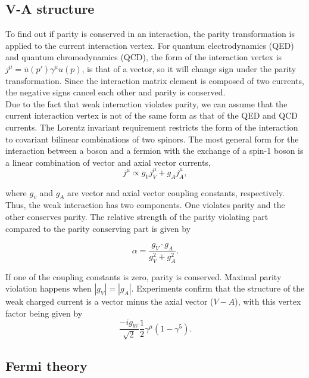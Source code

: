 \documentclass[10pt,swedish, openany]{book}
\begin{document}
\subsection{V-A structure}

To find out if parity is conserved in an interaction, the parity transformation is applied to the current interaction vertex. For quantum electrodynamics (QED) and quantum chromodynamics (QCD), the form of the interaction vertex is $j^{\mu}=\bar{u}(p')\gamma^{\mu}u(p)$, is that of a vector, so it will change sign under the parity transformation. Since the interaction matrix element is composed of two currents, the negative signs cancel each other and parity is conserved.\\

Due to the fact that weak interaction violates parity, we can assume that the current interaction vertex is not of the same form as that of the QED and QCD currents. The Lorentz invariant requirement restricts the form of the interaction to covariant bilinear combinations of two spinors. The most general form for the interaction between a boson and a fermion with the exchange of a spin-1 boson is a linear combination of vector and axial vector currents, 
\begin{equation}
    j^{\mu} \propto g_V j^{\mu}_V + g_A j^{\mu}_A, 
\end{equation}

where $g_v$ and $g_A$ are vector and axial vector coupling constants, respectively. Thus, the weak interaction has two components. One violates parity and the other conserves parity. The relative strength of the parity violating part compared to the parity conserving part is given by

\begin{equation}
    \alpha = \frac{g_V \cdot g_A}{g^2_V + g^2_A}.
\end{equation}

If one of the coupling constants is zero, parity is conserved. Maximal parity violation happens when $|g_V|=|g_A|$. Experiments confirm that the structure of the weak charged current is a vector minus the axial vector ($V-A$), with this vertex factor being given by
\begin{equation}
    \frac{- i g_W}{\sqrt{2}}\frac{1}{2}\gamma^{\mu}(1-\gamma^5).
\end{equation}

\subsection{Fermi theory}
\end{document}
